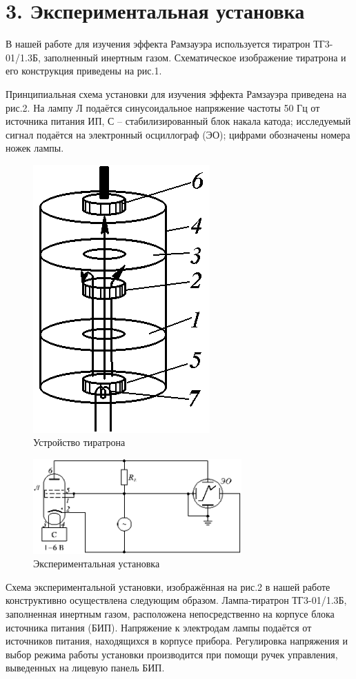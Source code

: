 \documentclass[a4paper,12pt]{report}
\begin{document}
\section*{3. Экспериментальная установка}

	В нашей работе для изучения эффекта Рамзауэра используется тиратрон ТГ3-01/1.3Б, заполненный инертным газом. Схематическое изображение тиратрона и его конструкция приведены на рис.1.
	
	Принципиальная схема установки для изучения эффекта Рамзауэра приведена на рис.2. На лампу Л подаётся синусоидальное напряжение частоты 50 Гц от источника питания ИП, С -- стабилизированный блок накала катода; исследуемый сигнал подаётся на электронный осциллограф (ЭО); цифрами обозначены номера ножек лампы.
	
	\begin{figure}[H]
    \centering
    \includegraphics[width=4 cm]{pic1.png}
    \caption{Устройство тиратрона}
    \label{fig:vac}
\end{figure}

\begin{figure}[H]
    \centering
    \includegraphics[width=8cm]{pic2.png}
    \caption{Экспериментальная установка
    }
    \label{fig:vac}
\end{figure}

	
	Схема экспериментальной установки, изображённая на рис.2 в нашей работе конструктивно осуществлена следующим образом. Лампа-тиратрон ТГ3-01/1.3Б, заполненная инертным газом, расположена непосредственно на корпусе блока источника питания (БИП). Напряжение к электродам лампы подаётся от источников питания, находящихся в корпусе прибора. Регулировка напряжения и выбор режима работы установки производится при помощи ручек управления, выведенных на лицевую панель БИП.
	
\end{document}
